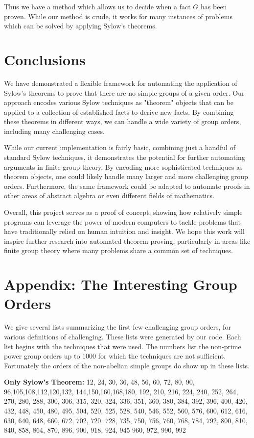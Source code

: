 \documentclass[11pt,
oneside]{article} %
\begin{document}
Thus we have a method which allows us to decide when a fact $G$ has
been proven.  While our method is crude, it works for many instances
of problems which can be solved by applying Sylow's theorems.

\section{Conclusions}

We have demonstrated a flexible framework for automating the
application of Sylow's theorems to prove that there are no simple
groups of a given order. Our approach encodes various Sylow techniques
as "theorem" objects that can be applied to a collection of
established facts to derive new facts. By combining these theorems in
different ways, we can handle a wide variety of group orders,
including many challenging cases.

While our current implementation is fairly basic, combining just a
handful of standard Sylow techniques, it demonstrates the potential
for further automating arguments in finite group theory. By encoding
more sophisticated techniques as theorem objects, one could likely
handle many larger and more challenging group orders. Furthermore, the
same framework could be adapted to automate proofs in other areas of
abstract algebra or even different fields of mathematics.

Overall, this project serves as a proof of concept, showing how
relatively simple programs can leverage the power of modern computers
to tackle problems that have traditionally relied on human intuition
and insight. We hope this work will inspire further research into
automated theorem proving, particularly in areas like finite group
theory where many problems share a common set of techniques.


\section{Appendix: The Interesting Group Orders}
We give several lists summarizing the first few challenging group
orders, for various definitions of challenging.  These lists were
generated by our code.  Each list begins with the techniques that were
used. The numbers list the non-prime power group orders up to 1000 for
which the techniques are not sufficient. Fortunately the orders of the
non-abelian simple groups do show up in these lists.  \newline

\textbf{Only Sylow's Theorem:} 12, 24, 30, 36, 48, 56, 60, 72,
80, 90, 96,105,108,112,120,132,
144,150,160,168,180, 192, 210, 216,
224, 240, 252, 264, 270, 280, 288, 300,
306, 315, 320, 324, 336, 351, 360, 380,
384, 392, 396, 400, 420, 432, 448, 450, 480, 495, 504, 520, 525, 528,
540, 546, 552, 560, 576, 600, 612, 616, 630,
640, 648, 660, 672, 702, 720, 728, 735, 750, 756, 760, 768,
784, 792, 800, 810, 840, 858, 864, 870, 896, 900, 918, 924, 945
960, 972, 990, 992
\newline
\end{document}
